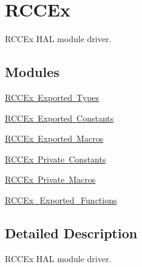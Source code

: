 \hypertarget{group___r_c_c_ex}{}\section{R\+C\+C\+Ex}
\label{group___r_c_c_ex}


R\+C\+C\+Ex H\+AL module driver.  


\subsection*{Modules}
\begin{DoxyCompactItemize}
\item 
\mbox{\hyperlink{group___r_c_c_ex___exported___types}{R\+C\+C\+Ex Exported Types}}
\item 
\mbox{\hyperlink{group___r_c_c_ex___exported___constants}{R\+C\+C\+Ex Exported Constants}}
\item 
\mbox{\hyperlink{group___r_c_c_ex___exported___macros}{R\+C\+C\+Ex Exported Macros}}
\item 
\mbox{\hyperlink{group___r_c_c_ex___private___constants}{R\+C\+C\+Ex Private Constants}}
\item 
\mbox{\hyperlink{group___r_c_c_ex___private___macros}{R\+C\+C\+Ex Private Macros}}
\item 
\mbox{\hyperlink{group___r_c_c_ex___exported___functions}{R\+C\+C\+Ex\+\_\+\+Exported\+\_\+\+Functions}}
\end{DoxyCompactItemize}


\subsection{Detailed Description}
R\+C\+C\+Ex H\+AL module driver. 

